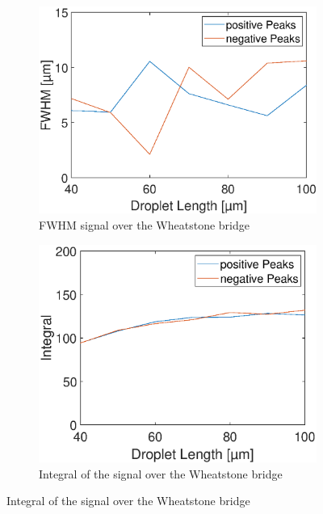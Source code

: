 \begin{figure}[h]
	\begin{subfigure}[l]{0.49\linewidth} 
		\centering
		\includegraphics[clip,trim={0mm 0mm 0mm 0mm}, width=\linewidth]{Ressourcen/Results/L-22/FWHM}
		\caption{FWHM signal over the Wheatstone bridge}
		\label{fig:sim:l:bridge:FWHM}
	\end{subfigure}
	\hfil
	\begin{subfigure}[r]{0.49\linewidth} 
		\centering
		\includegraphics[clip,trim={0mm 0mm 0mm 0mm}, width=\linewidth]{Ressourcen/Results/L-22/Int}
		\caption{Integral of the signal over the Wheatstone bridge}
		\label{fig:sim:l:bridge:int}
	\end{subfigure}

\end{figure}
